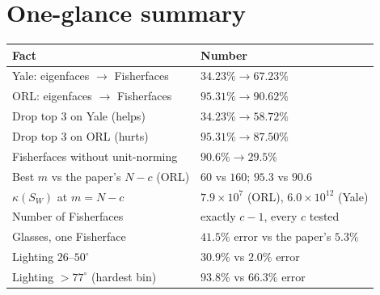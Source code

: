 \documentclass[11pt]{article}
\begin{document}
\section{One-glance summary}

\begin{center}
\begin{tabular}{ll}\toprule
Fact & Number\\\midrule
Yale: eigenfaces $\to$ Fisherfaces & $34.23\% \to 67.23\%$\\
ORL: eigenfaces $\to$ Fisherfaces & $95.31\% \to 90.62\%$\\
Drop top 3 on Yale (helps) & $34.23\% \to 58.72\%$\\
Drop top 3 on ORL (hurts) & $95.31\% \to 87.50\%$\\
Fisherfaces without unit-norming & $90.6\% \to 29.5\%$\\
Best $m$ vs the paper's $N-c$ (ORL) & $60$ vs $160$; $95.3$ vs $90.6$\\
$\kappa(S_W)$ at $m=N-c$ & $7.9\times10^{7}$ (ORL), $6.0\times10^{12}$ (Yale)\\
Number of Fisherfaces & exactly $c-1$, every $c$ tested\\
Glasses, one Fisherface & $41.5\%$ error vs the paper's $5.3\%$\\
Lighting $26$--$50^\circ$ & $30.9\%$ vs $2.0\%$ error\\
Lighting $>77^\circ$ (hardest bin) & $93.8\%$ vs $66.3\%$ error\\\bottomrule
\end{tabular}
\end{center}
\end{document}
